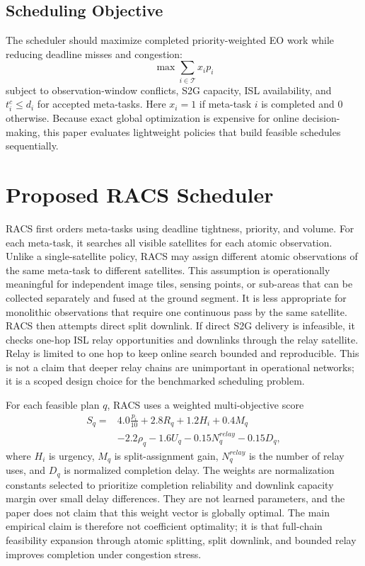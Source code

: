 \documentclass[conference]{IEEEtran}
\begin{document}
\subsection{Scheduling Objective}
The scheduler should maximize completed priority-weighted EO work while reducing deadline misses and congestion:
\begin{equation}
\max \sum_{i\in\mathcal{T}} x_i p_i
\end{equation}
subject to observation-window conflicts, S2G capacity, ISL availability, and $t^c_i\leq d_i$ for accepted meta-tasks. Here $x_i=1$ if meta-task $i$ is completed and $0$ otherwise. Because exact global optimization is expensive for online decision-making, this paper evaluates lightweight policies that build feasible schedules sequentially.

\section{Proposed RACS Scheduler}
RACS first orders meta-tasks using deadline tightness, priority, and volume. For each meta-task, it searches all visible satellites for each atomic observation. Unlike a single-satellite policy, RACS may assign different atomic observations of the same meta-task to different satellites. This assumption is operationally meaningful for independent image tiles, sensing points, or sub-areas that can be collected separately and fused at the ground segment. It is less appropriate for monolithic observations that require one continuous pass by the same satellite. RACS then attempts direct split downlink. If direct S2G delivery is infeasible, it checks one-hop ISL relay opportunities and downlinks through the relay satellite. Relay is limited to one hop to keep online search bounded and reproducible. This is not a claim that deeper relay chains are unimportant in operational networks; it is a scoped design choice for the benchmarked scheduling problem.

For each feasible plan $q$, RACS uses a weighted multi-objective score
\begin{equation}
\begin{split}
S_q ={}& 4.0\frac{p_i}{10}+2.8R_q+1.2H_i+0.4M_q\\
&-2.2\rho_q-1.6U_q-0.15N^{relay}_q-0.15D_q,
\end{split}
\end{equation}
where $H_i$ is urgency, $M_q$ is split-assignment gain, $N^{relay}_q$ is the number of relay uses, and $D_q$ is normalized completion delay. The weights are normalization constants selected to prioritize completion reliability and downlink capacity margin over small delay differences. They are not learned parameters, and the paper does not claim that this weight vector is globally optimal. The main empirical claim is therefore not coefficient optimality; it is that full-chain feasibility expansion through atomic splitting, split downlink, and bounded relay improves completion under congestion stress.
\end{document}
